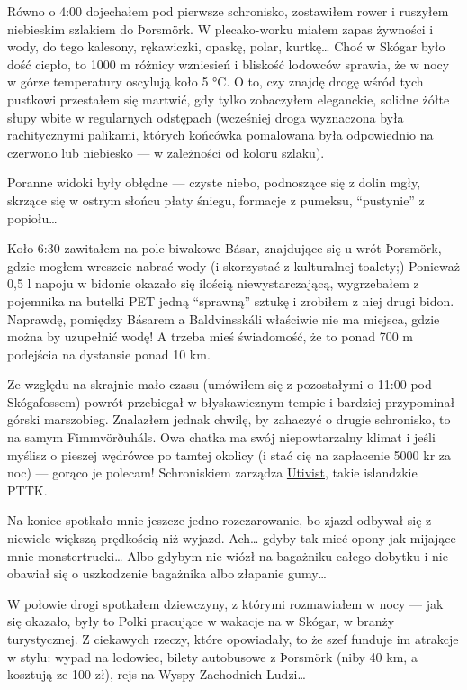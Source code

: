 Równo o 4:00 dojechałem pod pierwsze schronisko, zostawiłem rower i ruszyłem niebieskim szlakiem do Þorsmörk. W plecako-worku miałem zapas żywności i wody, do tego kalesony, rękawiczki, opaskę, polar, kurtkę… Choć w Skógar było dość ciepło, to 1000 m różnicy wzniesień i bliskość lodowców sprawia, że w nocy w górze temperatury oscylują koło 5 °C. O to, czy znajdę drogę wśród tych pustkowi przestałem się martwić, gdy tylko zobaczyłem eleganckie, solidne żółte słupy wbite w regularnych odstępach (wcześniej droga wyznaczona była rachitycznymi palikami, których końcówka pomalowana była odpowiednio na czerwono lub niebiesko --- w zależności od koloru szlaku).

Poranne widoki były obłędne --- czyste niebo, podnoszące się z dolin mgły, skrzące się w ostrym słońcu płaty śniegu, formacje z pumeksu, “pustynie” z popiołu…


Koło 6:30 zawitałem na pole biwakowe Básar,  znajdujące się u wrót Þorsmörk, gdzie mogłem wreszcie nabrać wody (i skorzystać z kulturalnej toalety;) Ponieważ 0,5 l napoju w bidonie okazało się ilością niewystarczającą, wygrzebałem z pojemnika na butelki PET jedną “sprawną” sztukę i zrobiłem z niej drugi bidon. Naprawdę, pomiędzy Básarem a Baldvinsskáli właściwie nie ma miejsca, gdzie można by uzupełnić wodę! A trzeba mieś świadomość, że to ponad 700 m podejścia na dystansie ponad 10 km.

Ze względu na skrajnie mało czasu (umówiłem się z pozostałymi o 11:00 pod Skógafossem) powrót przebiegał w błyskawicznym tempie i bardziej przypominał górski marszobieg. Znalazłem jednak chwilę, by zahaczyć o drugie schronisko, to na samym Fimmvörðuháls. Owa chatka ma swój niepowtarzalny klimat i jeśli myślisz o pieszej wędrówce po tamtej okolicy (i stać cię na zapłacenie 5000 kr za noc) --- gorąco je polecam! Schroniskiem zarządza \href{http://www.utivist.is/english}{Utivist}, takie islandzkie PTTK.

Na koniec spotkało mnie jeszcze jedno rozczarowanie, bo zjazd odbywał się z niewiele większą prędkością niż wyjazd. Ach… gdyby tak mieć opony jak mijające mnie monstertrucki… Albo gdybym nie wiózł na bagażniku całego dobytku i nie obawiał się o uszkodzenie bagażnika albo złapanie gumy…

W połowie drogi spotkałem dziewczyny, z którymi rozmawiałem w nocy --- jak się okazało, były to Polki pracujące w wakacje na w Skógar, w branży turystycznej. Z ciekawych rzeczy, które opowiadały, to że szef funduje im atrakcje w stylu: wypad na lodowiec, bilety autobusowe z Þorsmörk (niby 40 km, a kosztują ze 100 zł), rejs na Wyspy Zachodnich Ludzi…

